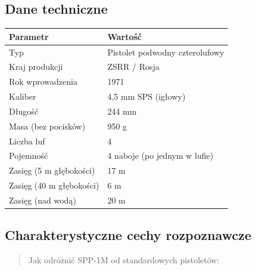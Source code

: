 \documentclass[12pt,oneside]{book}
\begin{document}
\subsection{Dane techniczne}\label{dane-techniczne-114}

\begin{longtable}[]{@{}ll@{}}
\toprule\noalign{}
Parametr & Wartość \\
\midrule\noalign{}
\endhead
\bottomrule\noalign{}
\endlastfoot
Typ & Pistolet podwodny czterolufowy \\
Kraj produkcji & ZSRR / Rosja \\
Rok wprowadzenia & 1971 \\
Kaliber & 4,5 mm SPS (igłowy) \\
Długość & 244 mm \\
Masa (bez pocisków) & 950 g \\
Liczba luf & 4 \\
Pojemność & 4 naboje (po jednym w lufie) \\
Zasięg (5 m głębokości) & 17 m \\
Zasięg (40 m głębokości) & 6 m \\
Zasięg (nad wodą) & 20 m \\
\end{longtable}

\subsection{Charakterystyczne cechy
rozpoznawcze}\label{charakterystyczne-cechy-rozpoznawcze-114}

\begin{quote}
Jak odróżnić SPP-1M od standardowych pistoletów:
\end{quote}
\end{document}
